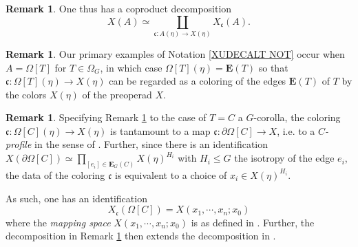 \documentclass[a4paper,10pt
,draft
]{article}%
\numberwithin{equation}{section}
\numberwithin{figure}{section}
\theoremstyle{definition} %
\newtheorem{remark}[equation]{Remark}%
\newcommand{\1}{\ensuremath{\mathbbm 1}}%
\begin{document}
\begin{remark}\label{COLDEC REM}
	One thus has a coproduct decomposition
\[
	X(A) \simeq 
	\coprod_{\mathfrak{c} \colon A(\eta) \to X(\eta)}
	X_{\mathfrak{c}}(A).
\]    
\end{remark}


\begin{remark}\label{PRIEX REM}
	Our primary examples of Notation \eqref{XUDECALT NOT}
	occur when $A=\Omega[T]$ for $T \in \Omega_G$,
	in which case 
	$\Omega[T](\eta) = \boldsymbol{E}(T)$
	so that
	$\mathfrak{c} \colon 
	\Omega[T](\eta) \to X(\eta)$
	can be regarded as a coloring of the edges 
	$\boldsymbol{E}(T)$
	of $T$ by the colors $X(\eta)$ of the preoperad $X$.
\end{remark}


\begin{remark}\label{MAPSPTRANS REM}
	Specifying Remark \ref{PRIEX REM} to the case 
	of $T=C$ a $G$-corolla, the coloring
	$\mathfrak{c} \colon 
	\Omega[C](\eta) \to X(\eta)$
	is tantamount to a map
	$\mathfrak{c} \colon \partial \Omega[C] \to X$,
	i.e. to a \emph{$C$-profile} in the sense of 
	\cite[Def. 5.6]{BP_edss}.
	Further, since there is an identification
	$X(\partial \Omega[C])
	\simeq
	\prod_{[e_i] \in \boldsymbol{E}_G(C)} X(\eta)^{H_i}$
	with $H_i \leq G$ the isotropy of the edge $e_i$,
	the data of the coloring $\mathfrak{c}$
	is equivalent to a choice of $x_i \in X(\eta)^{H_i}$.
	
	As such, one has an identification
\begin{equation}\label{MAPSPTRANS EQ}
	X_{\mathfrak{c}}(\Omega[C]) = X(x_1,\cdots,x_n;x_0)
\end{equation}
	where the \emph{mapping space}
	$X(x_1,\cdots,x_n;x_0)$
	is as defined in \cite[Defn. 5.7]{BP_edss}.
	Further, 
	the decomposition in Remark \ref{COLDEC REM}
	then extends the decomposition in 
	\cite[Rem. 5.14]{BP_edss}.
\end{remark}
\end{document}
